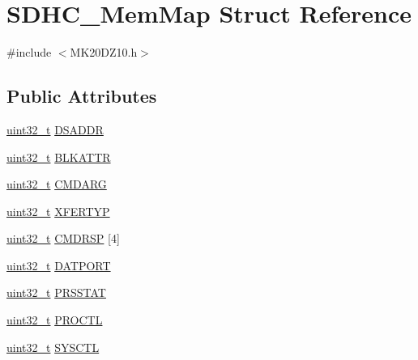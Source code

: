 \hypertarget{struct_s_d_h_c___mem_map}{}\section{S\+D\+H\+C\+\_\+\+Mem\+Map Struct Reference}
\label{struct_s_d_h_c___mem_map}


{\ttfamily \#include $<$M\+K20\+D\+Z10.\+h$>$}

\subsection*{Public Attributes}
\begin{DoxyCompactItemize}
\item 
\hyperlink{_p_e___types_8h_a33594304e786b158f3fb30289278f5af}{uint32\+\_\+t} \hyperlink{struct_s_d_h_c___mem_map_ab31a362061944d6279ddb9477319dadf}{D\+S\+A\+D\+DR}
\item 
\hyperlink{_p_e___types_8h_a33594304e786b158f3fb30289278f5af}{uint32\+\_\+t} \hyperlink{struct_s_d_h_c___mem_map_a0a3c9777e2dc6450d432235b772eddda}{B\+L\+K\+A\+T\+TR}
\item 
\hyperlink{_p_e___types_8h_a33594304e786b158f3fb30289278f5af}{uint32\+\_\+t} \hyperlink{struct_s_d_h_c___mem_map_a74b8ea7db5c12a06f19e8054bba5c2b3}{C\+M\+D\+A\+RG}
\item 
\hyperlink{_p_e___types_8h_a33594304e786b158f3fb30289278f5af}{uint32\+\_\+t} \hyperlink{struct_s_d_h_c___mem_map_ad6c008e044af83f7411e51258f111c48}{X\+F\+E\+R\+T\+YP}
\item 
\hyperlink{_p_e___types_8h_a33594304e786b158f3fb30289278f5af}{uint32\+\_\+t} \hyperlink{struct_s_d_h_c___mem_map_ad68e1706e76585042d163c6798c0f545}{C\+M\+D\+R\+SP} \mbox{[}4\mbox{]}
\item 
\hyperlink{_p_e___types_8h_a33594304e786b158f3fb30289278f5af}{uint32\+\_\+t} \hyperlink{struct_s_d_h_c___mem_map_a35328e0ac868a1173f45025dfe9d064a}{D\+A\+T\+P\+O\+RT}
\item 
\hyperlink{_p_e___types_8h_a33594304e786b158f3fb30289278f5af}{uint32\+\_\+t} \hyperlink{struct_s_d_h_c___mem_map_ad0cb5c4547908b9fc980737545a49824}{P\+R\+S\+S\+T\+AT}
\item 
\hyperlink{_p_e___types_8h_a33594304e786b158f3fb30289278f5af}{uint32\+\_\+t} \hyperlink{struct_s_d_h_c___mem_map_a432bb135855124848d9d885a4f31d88f}{P\+R\+O\+C\+TL}
\item 
\hyperlink{_p_e___types_8h_a33594304e786b158f3fb30289278f5af}{uint32\+\_\+t} \hyperlink{struct_s_d_h_c___mem_map_ae3204e728de4488f0b3569d1ebac78ae}{S\+Y\+S\+C\+TL}

\end{DoxyCompactItemize}
